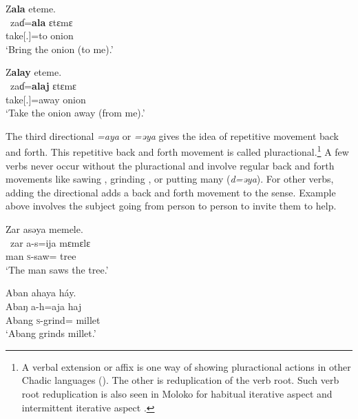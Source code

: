 \ea\label{ex:7:112}
Z\textbf{ala}  eteme.\\      
\gll  \ zaɗ=\textbf{ala}    ɛtɛmɛ\\
      take[{\twoS}.{\IMP}]=to    onion\\
\glt  ‘Bring the onion (to me).’\\
\z 

\ea\label{ex:7:113}
Z\textbf{alay}  eteme.\\
\gll  \ zaɗ=\textbf{alaj}    ɛtɛmɛ\\
      take[{\twoS}.{\IMP}]=away    onion\\
\glt  ‘Take the onion away (from me).’\\
\z 

The third directional \textit{=aya} or \textit{=}\textit{əya} gives the idea of repetitive movement back and forth. This repetitive back and forth movement is called pluractional.\footnote{A verbal extension or affix is one way of showing pluractional actions in other Chadic languages (\citealt{Newman1990}). The other is reduplication of the verb root. Such verb root reduplication is also seen in Moloko for habitual iterative aspect  and intermittent iterative aspect .} A few verbs never occur without the pluractional and involve regular back and forth movements like sawing , grinding , or putting many (\textit{d=əya}). For other verbs, adding the directional adds a back and forth movement to the sense. Example  above involves the subject going from person to person to invite them to help. 

\ea\label{ex:7:114}
Zar  asəya  memele.\\
\gll  \ zar  a-s=ija    mɛmɛlɛ\\
      man    \textsc{s}-saw={\PLU}  tree\\
\glt  ‘The man saws the tree.’\\
\z 

\ea\label{ex:7:115}
Aban  ahaya  háy.\\
\gll  Abaŋ   a-h=aja  haj\\
      Abang  \textsc{s}-grind={\PLU}  millet\\
\glt  ‘Abang grinds millet.’\\
\z 

